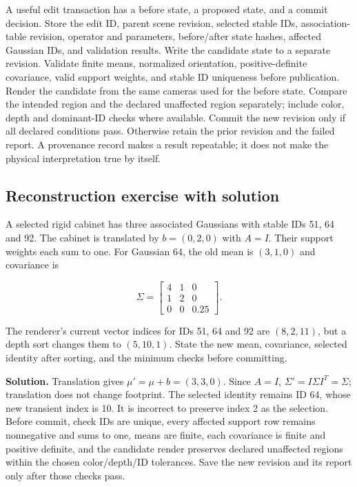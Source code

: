 A useful edit transaction has a before state, a proposed state, and a commit decision. Store the edit ID, parent scene revision, selected stable IDs, association-table revision, operator and parameters, before/after state hashes, affected Gaussian IDs, and validation results. Write the candidate state to a separate revision. Validate finite means, normalized orientation, positive-definite covariance, valid support weights, and stable ID uniqueness before publication. Render the candidate from the same cameras used for the before state. Compare the intended region and the declared unaffected region separately; include color, depth and dominant-ID checks where available. Commit the new revision only if all declared conditions pass. Otherwise retain the prior revision and the failed report. A provenance record makes a result repeatable; it does not make the physical interpretation true by itself.

\subsection{Reconstruction exercise with solution}\label{04-visual-computing-ii-ch039-reconstruction-exercise-with-solution}

\hypertarget{04-visual-computing-ii-ch039-reconstruction-exercise-with-solution}{}

A selected rigid cabinet has three associated Gaussians with stable IDs 51, 64 and 92. The cabinet is translated by \(b=(0,2,0)\) with \(A=I\). Their support weights each sum to one. For Gaussian 64, the old mean is \((3,1,0)\) and covariance is

\[
\Sigma=\begin{bmatrix}4&1&0\\1&2&0\\0&0&0.25\end{bmatrix}.
\]

The renderer's current vector indices for IDs 51, 64 and 92 are \((8,2,11)\), but a depth sort changes them to \((5,10,1)\). State the new mean, covariance, selected identity after sorting, and the minimum checks before committing.

\textbf{Solution.} Translation gives \(\mu' = \mu+b=(3,3,0)\). Since \(A=I\), \(\Sigma'=I\Sigma I^T=\Sigma\); translation does not change footprint. The selected identity remains ID 64, whose new transient index is 10. It is incorrect to preserve index 2 as the selection. Before commit, check IDs are unique, every affected support row remains nonnegative and sums to one, means are finite, each covariance is finite and positive definite, and the candidate render preserves declared unaffected regions within the chosen color/depth/ID tolerances. Save the new revision and its report only after those checks pass.

